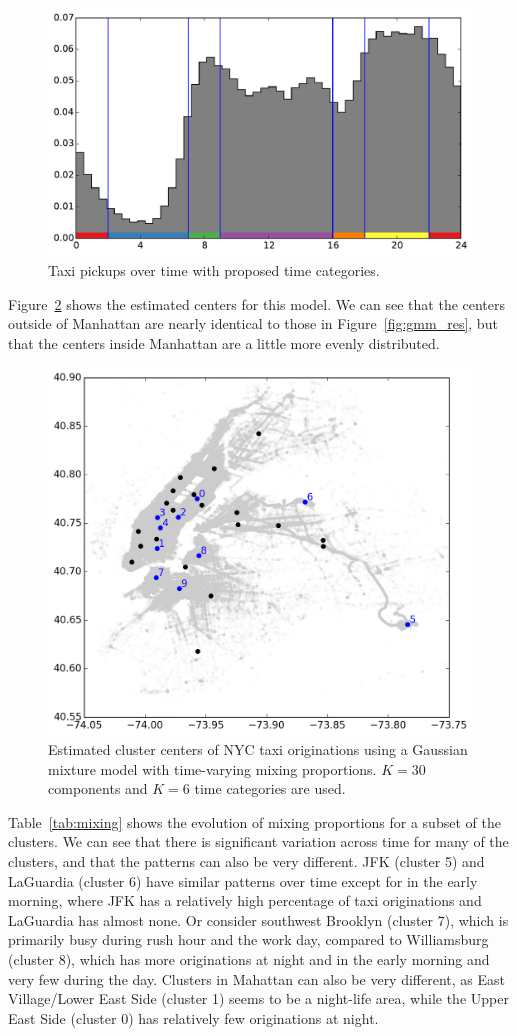 \documentclass[12pt]{article}
\theoremstyle{definition}
\theoremstyle{algodesc}
\begin{document}
\begin{figure}[htb] \centering
  \includegraphics[width=0.8\linewidth]{./include/time.pdf}
  \caption{Taxi pickups over time with proposed time categories.}
  \label{fig:time}
\end{figure}

Figure~\ref{fig:gmm_cat_res} shows the estimated centers for this model. We can see that the centers outside of Manhattan are nearly identical to those in Figure~\ref{fig:gmm_res}, but that the centers inside Manhattan are a little more evenly distributed.

\begin{figure}[tb] \centering
  \includegraphics[width=0.7\linewidth]{./include/gmm_cat_res.png}
  \caption{Estimated cluster centers of NYC taxi originations using a Gaussian mixture model with time-varying mixing proportions. $K=30$ components and $K=6$ time categories are used.}
  \label{fig:gmm_cat_res}
\end{figure}

Table~\ref{tab:mixing} shows the evolution of mixing proportions for a subset of the clusters. We can see that there is significant variation across time for many of the clusters, and that the patterns can also be very different. JFK (cluster 5) and LaGuardia (cluster 6) have similar patterns over time except for in the early morning, where JFK has a relatively high percentage of taxi originations and LaGuardia has almost none. Or consider southwest Brooklyn (cluster 7), which is primarily busy during rush hour and the work day, compared to Williamsburg (cluster 8), which has more originations at night and in the early morning and very few during the day. Clusters in Mahattan can also be very different, as East Village/Lower East Side (cluster 1) seems to be a night-life area, while the Upper East Side (cluster 0) has relatively few originations at night.
\end{document}
